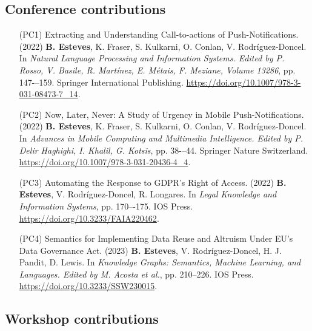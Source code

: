 \subsection{Conference contributions}
\label{sec:publications_conference}

\begin{enumerate}
    \item [(PC1)] Extracting and Understanding Call-to-actions of Push-Notifications. (2022) \textbf{B. Esteves}, K. Fraser, S. Kulkarni, O. Conlan, V. Rodríguez-Doncel.  In \textit{Natural Language Processing and Information Systems. Edited by P. Rosso, V. Basile, R. Martínez, E. Métais, F. Meziane, Volume 13286}, pp. 147-–159. Springer International Publishing. \url{https://doi.org/10.1007/978-3-031-08473-7\_14}.
    \item [(PC2)] Now, Later, Never: A Study of Urgency in Mobile Push-Notifications. (2022) \textbf{B. Esteves}, K. Fraser, S. Kulkarni, O. Conlan, V. Rodríguez-Doncel. In \textit{Advances in Mobile Computing and Multimedia Intelligence. Edited by P. Delir Haghighi, I. Khalil, G. Kotsis}, pp. 38-–44. Springer Nature Switzerland. \url{https://doi.org/10.1007/978-3-031-20436-4\_4}.
    \item [(PC3)] Automating the Response to GDPR’s Right of Access. (2022) \textbf{B. Esteves}, V. Rodríguez-Doncel, R. Longares. In \textit{Legal Knowledge and Information Systems}, pp. 170–-175. IOS Press. \url{https://doi.org/10.3233/FAIA220462}.
    \item [(PC4)] Semantics for Implementing Data Reuse and Altruism Under EU’s Data Governance Act. (2023) \textbf{B. Esteves}, V. Rodríguez-Doncel,  H. J. Pandit, D. Lewis. In \textit{Knowledge Graphs: Semantics, Machine Learning, and Languages. Edited by M. Acosta et al.}, pp. 210--226. IOS Press. \url{https://doi.org/10.3233/SSW230015}.
\end{enumerate}

\subsection{Workshop contributions}
\label{sec:publications_workshop}

